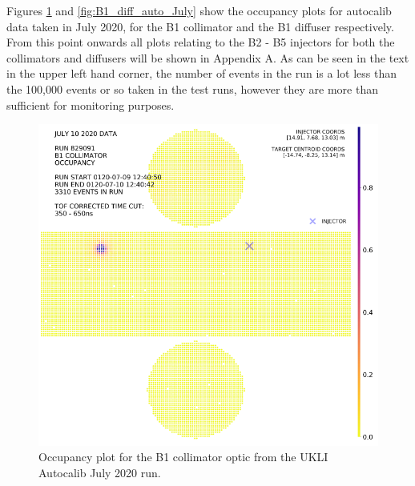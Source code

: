 Figures \ref{fig:B1_coll_auto_July} and \ref{fig:B1_diff_auto_July} show the occupancy plots for autocalib data taken in July 2020, for the B1 collimator and the B1 diffuser respectively. From this point onwards all plots relating to the B2 - B5 injectors for both the collimators and diffusers will be shown in Appendix A. As can be seen in the text in the upper left hand corner, the number of events in the run is a lot less than the 100,000 events or so taken in the test runs, however they are more than sufficient for monitoring purposes.


\begin{figure}
    \centering
    
    \begin{minipage}{0.47\textwidth}
        \centering
        \includegraphics[width=\textwidth]{Figures/B1_occupancy_coll_auto.PNG} %
        \caption{Occupancy plot for the B1 collimator optic from the UKLI Autocalib July 2020 run.}
        \label{fig:B1_coll_auto_July}
    \end{minipage}\hfill
    \begin{minipage}{0.47\textwidth}
        \centering

\end{minipage}
\end{figure}
